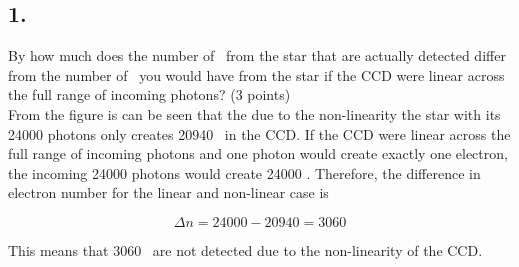 \documentclass[11pt,a4paper,twoside]{article}
\newcommand{\electron}{\ce{e^-}}
\begin{document}
\subsection*{1.} By how much does the number of \electron \ from the star that are actually detected differ from the number of \electron \ you would have from the star if the CCD were linear across the full range of incoming photons? (3 points) \\

From the figure is can be seen that the due to the non-linearity the star with its \num{24000} photons only creates \num{20940} \electron \ in the CCD. If the CCD were linear across the full range of incoming photons and one photon would create exactly one electron, the incoming \num{24000} photons would create \num{24000} \electron. Therefore, the difference in electron number for the linear and non-linear case is 

\begin{equation}
 \Delta n = \num{24000} - \num{20940} = \num{3060}
\end{equation}

This means that \num{3060} \electron \ are not detected due to the non-linearity of the CCD. 
\end{document}
